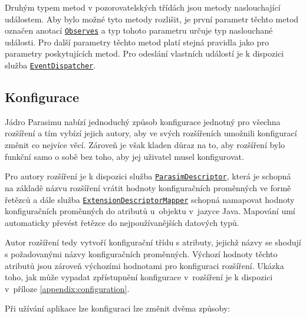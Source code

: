 Druhým typem metod v pozorovatelských třídách jsou metody na\-slou\-cha\-jí\-cí událostem.
Aby bylo možné tyto metody rozlišit, je první parametr těchto metod označen anotací \href{https://github.com/sybila/parasim/blob/2.0.0.Final/core/src/main/java/org/sybila/parasim/core/annotation/Observes.java}{\texttt{Observes}}
a typ tohoto parametru určuje typ naslouchané události. Pro další parametry těchto metod platí
stejná pravidla jako pro parametry poskytujících metod. Pro odeslání vlastních událostí
je k dispozici služba \href{https://github.com/sybila/parasim/blob/2.0.0.Final/core/src/main/java/org/sybila/parasim/core/api/EventDispatcher.java}{\texttt{EventDispatcher}}.

\subsection{Konfigurace}

Jádro Parasimu nabízí jednoduchý způsob konfigurace jednotný pro všech\-na rozšíření
a tím vybízí jejich autory, aby ve svých rozšířeních umožnili konfigurací změnit
co nejvíce věcí. Zároveň je však kladen důraz na to, aby rozšíření bylo funkční 
samo o sobě bez toho, aby jej uživatel musel konfigurovat.

Pro autory rozšíření je k dispozici služba \href{https://github.com/sybila/parasim/blob/2.0.0.Final/core/src/main/java/org/sybila/parasim/core/api/configuration/ParasimDescriptor.java}{\texttt{ParasimDescriptor}},
která je schopná na základě názvu rozšíření vrátit hodnoty konfiguračních pro\-měn\-ných
ve formě řetězců a dále služba \href{https://github.com/sybila/parasim/blob/2.0.0.Final/core/src/main/java/org/sybila/parasim/core/api/configuration/ExtensionDescriptorMapper.java}{\texttt{ExtensionDescriptorMapper}} schopná namapovat hodnoty konfiguračních pro\-měn\-ných
do atributů u~objektu v~jazyce Java. Mapování umí automaticky převést řetězce
do nej\-pou\-ží\-va\-něj\-ších datových typů.

Autor rozšíření tedy vytvoří konfigurační třídu s atributy, jejichž názvy se shodují
s požadovanými názvy konfiguračních proměnných. Výchozí hodnoty těchto atributů jsou
zároveň výchozími hodnotami pro konfiguraci rozšíření. Ukázka toho, jak může vypadat
zpřístupnění konfigurace v~rozšíření je k dispozici v~příloze \ref{appendix:configuration}.

Při užívání aplikace lze konfiguraci lze změnit dvěma způsoby:

